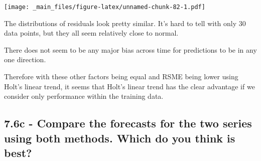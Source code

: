 \documentclass[]{book}
\newenvironment{Shaded}{\begin{snugshade}}{\end{snugshade}}
\newcommand{\ControlFlowTok}[1]{\textcolor[rgb]{0.13,0.29,0.53}{\textbf{#1}}}
\newcommand{\DataTypeTok}[1]{\textcolor[rgb]{0.13,0.29,0.53}{#1}}
\newcommand{\DecValTok}[1]{\textcolor[rgb]{0.00,0.00,0.81}{#1}}
\newcommand{\KeywordTok}[1]{\textcolor[rgb]{0.13,0.29,0.53}{\textbf{#1}}}
\newcommand{\NormalTok}[1]{#1}
\newcommand{\OperatorTok}[1]{\textcolor[rgb]{0.81,0.36,0.00}{\textbf{#1}}}
\newcommand{\StringTok}[1]{\textcolor[rgb]{0.31,0.60,0.02}{#1}}
\begin{document}
\begin{Shaded}
\end{Shaded}

\texttt{[image: \_main\_files/figure-latex/unnamed-chunk-82-1.pdf]}

The distributions of residuals look pretty similar. It's hard to tell with only 30 data points, but they all seem relatively close to normal.

There does not seem to be any major bias across time for predictions to be in any one direction.

Therefore with these other factors being equal and RSME being lower using Holt's linear trend, it seems that Holt's linear trend has the clear advantage if we consider only performance within the training data.

\hypertarget{c---compare-the-forecasts-for-the-two-series-using-both-methods.-which-do-you-think-is-best}{%
\subsection{7.6c - Compare the forecasts for the two series using both methods. Which do you think is best?}\label{c---compare-the-forecasts-for-the-two-series-using-both-methods.-which-do-you-think-is-best}}
\end{document}
